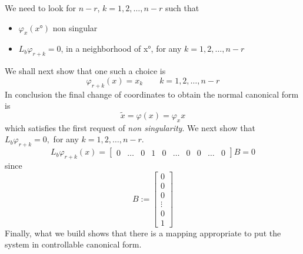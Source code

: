 We need to look for $n-r$, $k=1,2,\dots,n-r$ such that \begin{itemize}
	\item $\varphi_x(x°)$ non singular
	\item $L_b\varphi_{r+k}=0$, in a neighborhood of x°, for any $k=1,2,\dots,n-r$
\end{itemize}
We shall next show that one such a choice is \[
\varphi_{r+k}(x)=x_k \qquad k=1,2,\dots, n-r
\]In conclusion the final change of coordinates to obtain the normal canonical form is \[\tilde{x}=\varphi(x)=\varphi_xx\] which satisfies the first request of \emph{non singularity}. We next show that $L_b\varphi_{r+k}=0,$ for any $k=1,2,\dots,n-r$.\[
L_b\varphi_{r+k}(x)=\begin{bmatrix}
	0&\dots&0&1&0&\dots&0&0&\dots&0
\end{bmatrix}B=0
\] since \begin{equation*}
B:=\begin{bmatrix}
	0	\\
	0	\\
	0	\\
	\vdots\\
	0\\
	1
\end{bmatrix}
\end{equation*}
Finally, what we build shows that there is a mapping appropriate to put the system in controllable canonical form.
